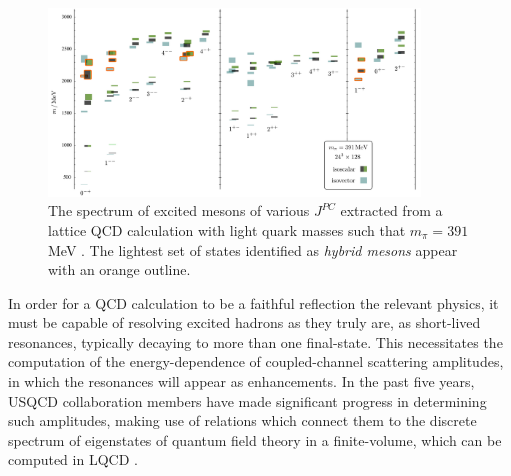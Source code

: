 \begin{figure}
\includegraphics[width=0.88\textwidth]{figures/isoscalar}
\caption{The spectrum of excited mesons of various $J^{PC}$ extracted from a lattice QCD calculation with light quark masses such that $m_\pi = 391$ MeV \cite{Dudek:2013yja}. The lightest set of states identified as \emph{hybrid mesons} appear with an orange outline.}
\label{spectrum}
\end{figure}

In order for a QCD calculation to be a faithful reflection the relevant physics, it must be capable of resolving excited hadrons as they truly are, as short-lived resonances, typically decaying to more than one final-state. This necessitates the computation of the energy-dependence of coupled-channel scattering amplitudes, in which the resonances will appear as enhancements. In the past five years, USQCD collaboration members have made significant progress in determining such amplitudes, making use of relations which connect them to the discrete spectrum of eigenstates of quantum field theory in a finite-volume, which can be computed in LQCD
\cite{Luscher:1986pf, Luscher:1990ux, Rummukainen:1995vs, Feng:2004ua, He:2005ey, Bedaque:2004kc, Liu:2005kr, Kim:2005gf, Christ:2005gi, Lage:2009zv, Bernard:2010fp, Fu:2011xz, Leskovec:2012gb,  Briceno:2012yi, Hansen:2012tf, Guo:2012hv, Li:2012bi, Briceno:2013hya, Briceno:2014oea}.

